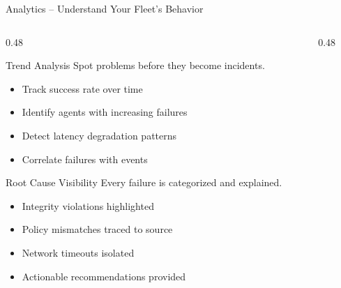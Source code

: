 \begin{frame}{Analytics -- Understand Your Fleet's Behavior}
  \begin{columns}[T]
    \begin{column}{0.48\textwidth}
      \begin{block}{Trend Analysis}
        \scriptsize
        Spot problems before they become incidents.
      \end{block}
      \scriptsize
      \begin{itemize}
        \item Track success rate over time
        \item Identify agents with increasing failures
        \item Detect latency degradation patterns
        \item Correlate failures with events
      \end{itemize}

      \vspace{0.2cm}

      \begin{block}{Root Cause Visibility}
        \scriptsize
        Every failure is categorized and explained.
      \end{block}
      \scriptsize
      \begin{itemize}
        \item Integrity violations highlighted
        \item Policy mismatches traced to source
        \item Network timeouts isolated
        \item Actionable recommendations provided
      \end{itemize}
    \end{column}
    \begin{column}{0.48\textwidth}
      \begin{center}
      \end{center}
    \end{column}
  \end{columns}
\end{frame}
